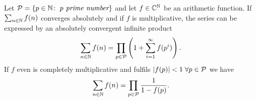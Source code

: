 \begin{theorem}
	Let $\mathcal{P} = \left\{p \in \mathbb{N} \colon \; p \textit{ prime number}\right\}$ and let $f \in \mathbb{C}^{\mathbb{N}}$ be an arithmetic function. If $\sum_{n \in \mathbb{N}} f(n)$ converges absolutely and if $f$ is multiplicative, the series can be expressed by an absolutely convergent infinite product
\begin{equation*}
	\sum_{n \in \mathbb{N}} f(n) = \prod_{p \in \mathcal{P}} \left(1 + \sum_{i = 1}^\infty f(p^i)\right).
\end{equation*}
	If $f$ even is completely multiplicative and fulfils $\left|f(p)\right| < 1 \; \forall p \in \mathcal{P}$ we have
\begin{equation*}
	\sum_{n \in \mathbb{N}} f(n) = \prod_{p \in \mathcal{P}} \frac{1}{1 - f(p)}.
\end{equation*}
\end{theorem}
